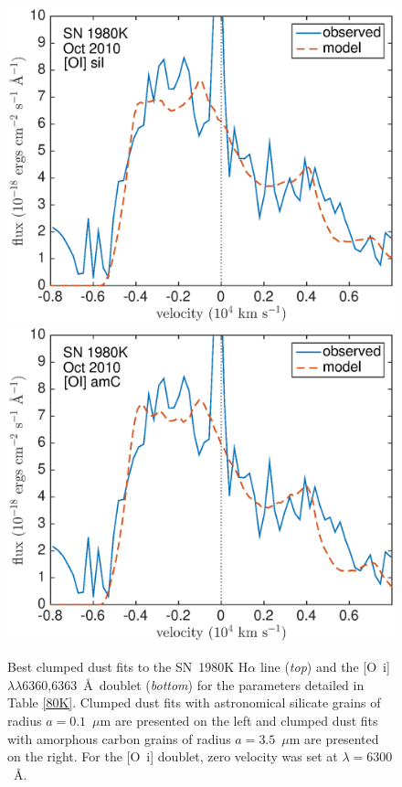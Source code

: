 \begin{figure}[!t]
\includegraphics[scale=0.4,clip=true, trim=20 0 40 20]{chapters/chapter6/figs/80K/clumped/OI}
\includegraphics[scale=0.4,clip=true, trim=20 0 40 20]{chapters/chapter6/figs/80K/clumped/OI_amC}
\caption{Best clumped dust fits to the SN~1980K H$\alpha$ line ({\em top}) and the [O~{\sc i}]$\lambda\lambda$6360,6363~\AA\ doublet ({\em bottom}) for the parameters detailed in Table \ref{80K}.  Clumped dust fits with astronomical silicate grains of radius $a=0.1$~$\mu$m are presented on the left and clumped dust fits with amorphous carbon grains of radius $a=3.5$~$\mu$m are presented on the right. For the [O~{\sc i}] doublet, zero velocity was set at $\lambda=6300$~\AA.}
\label{80K_clumped}
\end{figure}

